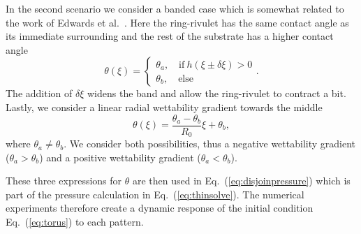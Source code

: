 \documentclass[twoside,twocolumn,9pt]{article}
\begin{document}
In the second scenario we consider a banded case which is somewhat related to the work of Edwards et al.~\cite{edwardsControllingBreakupToroidal2021}. 
Here the ring-rivulet has the same contact angle as its immediate surrounding and the rest of the substrate has a higher contact angle
\begin{equation}\label{eq:theta_band}
    \theta(\xi) =\begin{cases}
        \theta_a,\quad \text{if}~h(\xi\pm \delta\xi) > 0\\
        \theta_b,\quad \text{else}
    \end{cases}.
\end{equation}
The addition of $\delta\xi$ widens the band and allow the ring-rivulet to contract a bit.  
Lastly, we consider a linear radial wettability gradient towards the middle
\begin{equation}\label{eq:theta_grad}
    \theta(\xi) = \frac{\theta_{a}-\theta_{b}}{R_0} \xi + \theta_{b},
\end{equation}
where $\theta_{a}\neq\theta_{b}$.
We consider both possibilities, thus a negative wettability gradient ($\theta_a > \theta_b$) and a positive wettability gradient ($\theta_a < \theta_b$).

These three expressions for $\theta$ are then used in Eq.~(\ref{eq:disjoinpressure}) which is part of the pressure calculation in Eq.~(\ref{eq:thinsolve}).
The numerical experiments therefore create a dynamic response of the initial condition Eq.~(\ref{eq:torus}) to each pattern.
\end{document}
